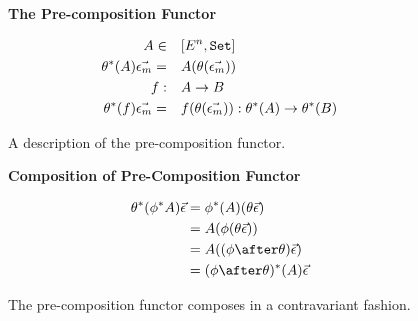 \documentclass{Report}
\begin{document}
\begin{figure}
    \begin{framed}
        \centering
        \textbf{The Pre-composition Functor}

        \begin{align*}
            A\in&\quad [E^n, \texttt{Set}]\\
            \theta^*(A) \vec{\epsilon_m} =&\quad  A(\theta(\vec{\epsilon_m}))\\
            f:&\quad A \rightarrow B\\
            \theta^*(f) \vec{\epsilon_m} =&\quad f(\theta(\vec{\epsilon_m})): \theta^*(A) \rightarrow \theta^*(B)\\
        \end{align*}
    \end{framed}
    \caption{A description of the pre-composition functor.}
    \label{PrecompositionFunctor}
\end{figure}

\begin{figure}
    \begin{framed}
        \centering
        \textbf{Composition of Pre-Composition Functor}

        \begin{align*}
            \theta\star(\phi\star A) \ev & = \phi\star(A)(\theta \ev)\\
            & = A(\phi(\theta\ev))\\
            & = A((\phi\after\theta) \ev)\\
            & = (\phi\after\theta)\star(A) \ev
        \end{align*}
    \end{framed}

    \caption{The pre-composition functor composes in a contravariant fashion.}
    \label{PrecompositionFunctorComposition}
\end{figure}
\end{document}
